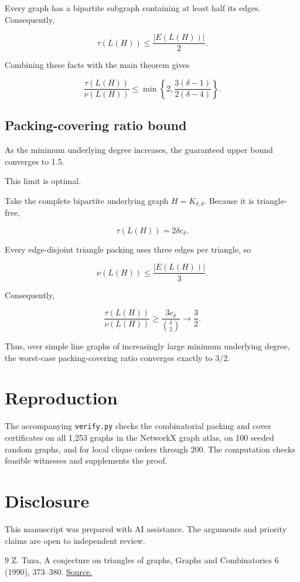 \documentclass[11pt]{article}
\begin{document}
Every graph has a bipartite subgraph containing at least half its edges. Consequently,

\[
\tau(L(H))\leq\frac{|E(L(H))|}{2}.
\]

Combining these facts with the main theorem gives

\[
\boxed{
\frac{\tau(L(H))}{\nu(L(H))}
\leq
\min\left\{2,\frac{3(\delta-1)}{2(\delta-4)}\right\}.
}
\]

\subsection{Packing-covering ratio bound}

As the minimum underlying degree increases, the guaranteed upper bound converges to 1.5.

This limit is optimal.

Take the complete bipartite underlying graph \(H=K_{\delta,\delta}\). Because it is triangle-free,

\[
\tau(L(H))=2\delta c_\delta.
\]

Every edge-disjoint triangle packing uses three edges per triangle, so

\[
\nu(L(H))\leq\frac{|E(L(H))|}{3}.
\]

Consequently,

\[
\frac{\tau(L(H))}{\nu(L(H))}
\geq\frac{3c_\delta}{\binom{\delta}{2}}
\longrightarrow\frac32.
\]

Thus, over simple line graphs of increasingly large minimum underlying degree, the worst-case packing-covering ratio converges exactly to \(3/2\).

\section{Reproduction}
The accompanying \texttt{verify.py} checks the combinatorial packing and cover certificates on all 1,253 graphs in the NetworkX graph atlas, on 100 seeded random graphs, and for local clique orders through 200. The computation checks feasible witnesses and supplements the proof.

\section*{Disclosure}
This manuscript was prepared with AI assistance. The arguments and priority claims are open to independent review.

\begin{thebibliography}{9}
 Z. Tuza, A conjecture on triangles of graphs, Graphs and Combinatorics 6 (1990), 373--380. \href{https://doi.org/10.1007/BF01787705}{Source.}
\end{thebibliography}
\end{document}
